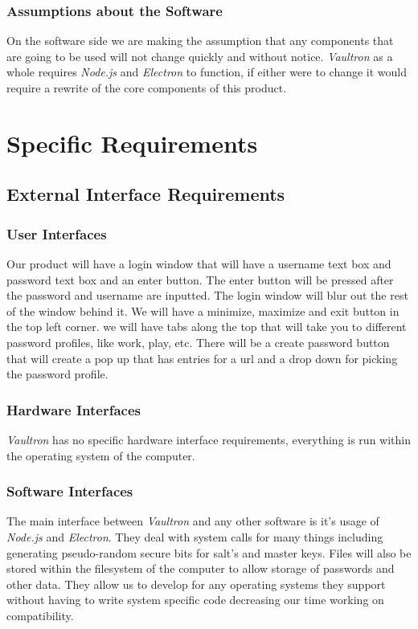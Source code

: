\documentclass[11pt]{report}
\begin{document}
\subsection{Assumptions about the Software}
On the software side we are making the assumption that any components that are
going to be used will not change quickly and without notice. \textit{Vaultron} 
as a whole requires \textit{Node.js} and \textit{Electron} to function, if 
either were to change it would require a rewrite of the core components of 
this product.



\chapter{Specific Requirements}

\section{External Interface Requirements}

\subsection{User Interfaces}
Our product will have a login window that will have a username text box and password
text box and an enter button. The enter button will be pressed after the password 
and username are inputted. The login window will blur out the rest of the window
behind it.
We will have a minimize, maximize  and exit button in the top left corner. 
we will have tabs along the top that will take you to different password profiles,
like work, play, etc. 
There will be a create password button that will create a pop up that has entries
for a url and a drop down for picking the password profile. 

\subsection{Hardware Interfaces}
\textit{Vaultron} has no specific hardware interface requirements, everything is
run within the operating system of the computer. 


\subsection{Software Interfaces}
The main interface between \textit{Vaultron} and any other software is it's
usage of \textit{Node.js} and \textit{Electron}. They deal with system calls 
for many things including generating pseudo-random secure bits for salt's and 
master keys. Files will also be stored within the filesystem of the computer 
to allow storage of passwords and other data. They allow us to develop for
any operating systems they support without having to write system specific
code decreasing our time working on compatibility. 
\end{document}
